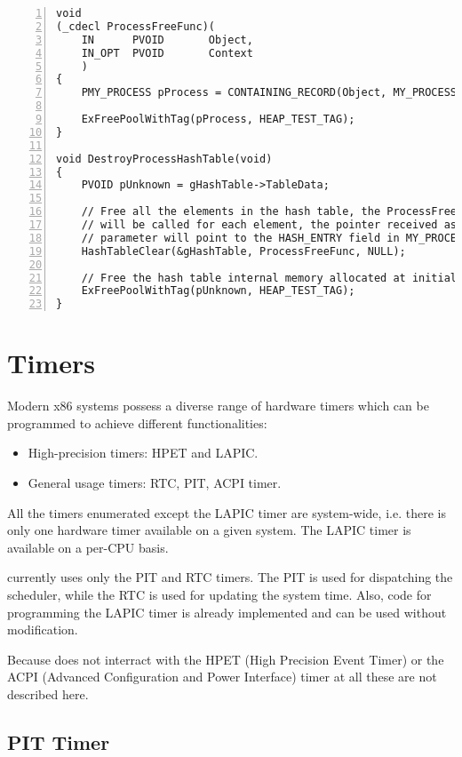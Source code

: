 \begin{appendices}
\begin{lstlisting}[caption={Hash Destruction Example},label={lst:HashDestEg},numbers=left]
void
(_cdecl ProcessFreeFunc)(
    IN      PVOID       Object,
    IN_OPT  PVOID       Context
    )
{
	PMY_PROCESS pProcess = CONTAINING_RECORD(Object, MY_PROCESS, HashEntry);
	
	ExFreePoolWithTag(pProcess, HEAP_TEST_TAG);
}

void DestroyProcessHashTable(void)
{
	PVOID pUnknown = gHashTable->TableData;

	// Free all the elements in the hash table, the ProcessFreeFunc function
	// will be called for each element, the pointer received as the first
	// parameter will point to the HASH_ENTRY field in MY_PROCESS
	HashTableClear(&gHashTable, ProcessFreeFunc, NULL);

	// Free the hash table internal memory allocated at initialization
	ExFreePoolWithTag(pUnknown, HEAP_TEST_TAG);
}
\end{lstlisting}

\section{Timers}

Modern x86 systems possess a diverse range of hardware timers which can be programmed to achieve different
functionalities:
\begin{itemize}
	\item High-precision timers: HPET and LAPIC.
	\item General usage timers: RTC, PIT, ACPI timer.
\end{itemize}

All the timers enumerated except the LAPIC timer are system-wide, i.e. there is only one hardware timer available on a
given system. The LAPIC timer is available on a per-CPU basis.

\projectname currently uses only the PIT and RTC timers. The PIT is used for dispatching the scheduler, while the RTC is
used for updating the system time. Also, code for programming the LAPIC timer is already implemented and can be used
without modification.

Because \projectname does not interract with the HPET (High Precision Event Timer) or the ACPI (Advanced Configuration
and Power Interface) timer at all these are not described here.

\subsection{PIT Timer}


\end{appendices}
